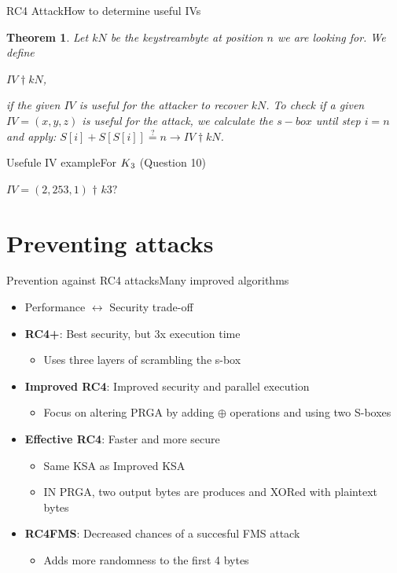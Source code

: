 \documentclass[
	aspectratio=169,	%
	onlytextwidth,		%
	t,					%
	]{beamer}
\newtheorem{thm}{Theorem}
\begin{document}
\begin{frame}[fragile]{RC4 Attack}{How to determine useful IVs}
	\begin{thm}
		Let $kN$ be the keystreambyte at position $n$ we are looking for. We define\\
		\begin{center}$IV \dagger kN$,
		\end{center}
		if the given $IV$ is useful for the attacker to recover $kN$.
		To check if a given $IV=(x,y,z)$ is useful for the attack, we calculate the $s-box$ until step $i=n$ and apply:
		$S[i] + S[S[i]] \stackrel{?}{=} n \rightarrow IV \dagger kN$.
	\end{thm} 
\end{frame}

\begin{frame}[fragile]{Usefule IV example}{For $K\textsubscript{3}$ (Question 10)}
	\begin{itemize}
		$IV=(2,253,1)$ $\dagger$ $k3?$ 
	\end{itemize}
\end{frame}

\section{Preventing attacks}

\begin{frame}[fragile]{Prevention against RC4 attacks}{Many improved algorithms}
	\begin{itemize}
		\item Performance $\leftrightarrow$ Security trade-off
		\item \textbf{RC4+}: Best security, but 3x execution time
		\begin{itemize}
			\item Uses three layers of scrambling the s-box 
		\end{itemize}
		\item \textbf{Improved RC4}: Improved security and parallel execution
		\begin{itemize}
			\item Focus on altering PRGA by adding $\oplus$ operations and using two S-boxes
		\end{itemize}
		\item \textbf{Effective RC4}: Faster and more secure
		\begin{itemize}
			\item Same KSA as Improved KSA 
			\item IN PRGA, two output bytes are produces and XORed with plaintext bytes
		\end{itemize}
		\item \textbf{RC4FMS}: Decreased chances of a succesful FMS attack
		\begin{itemize}
			\item Adds more randomness to the first 4 bytes 
		\end{itemize}
	\end{itemize}
\end{frame}
\end{document}
